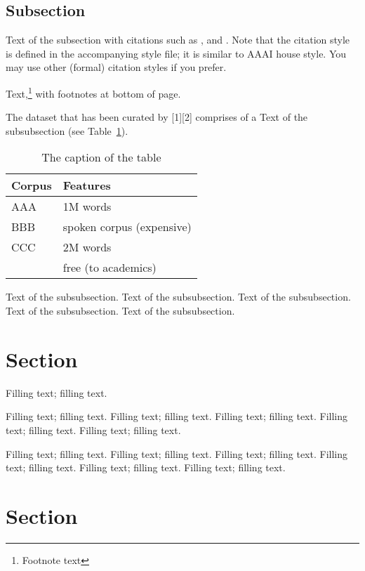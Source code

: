 \documentclass[11pt]{article}
\begin{document}
\subsection{Subsection}

Text of the subsection with citations such as 
,  and .
Note that the citation style is defined in the accompanying
style file; it is similar to AAAI house style. You may use
other (formal) citation styles if you prefer.


Text,\footnote{Footnote text} with footnotes at bottom of page.


The dataset that has been curated by [1][2] comprises of a 
Text of the subsubsection (see Table~\ref{table1}).

\begin{table}[h]
 \begin{center}
\begin{tabular}{|l|l|}

      \hline
      Corpus & Features\\
      \hline\hline
      AAA & 1M words\\
      BBB & spoken corpus (expensive)\\
      CCC & 2M words\\
        & free (to academics)\\
      \hline

\end{tabular}
\caption{The caption of the table}\label{table1}
 \end{center}
\end{table}


Text of the subsubsection.
Text of the subsubsection.
Text of the subsubsection.
Text of the subsubsection.
Text of the subsubsection.


\section{Section}

Filling text; filling text.

Filling text; filling text.
Filling text; filling text.
Filling text; filling text.
Filling text; filling text.
Filling text; filling text.

Filling text; filling text.
Filling text; filling text.
Filling text; filling text.
Filling text; filling text.
Filling text; filling text.
Filling text; filling text.

\section{Section}
\end{document}
